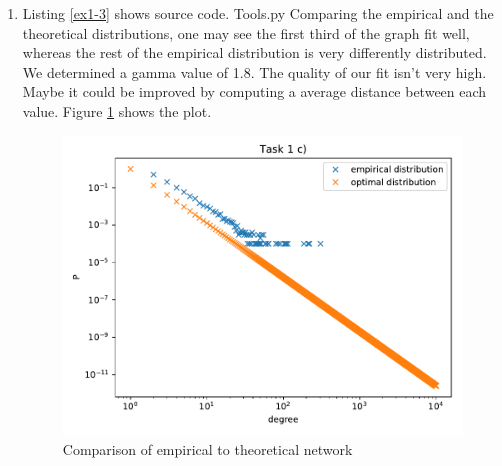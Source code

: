 \documentclass[10pt,a4paper]{article}
\begin{document}
\begin{enumerate}
\item Listing \ref{ex1-3} shows source code.
 {Tools.py}
Comparing the empirical and the theoretical distributions, one may see the first third of the graph fit well, whereas the rest of the empirical distribution is very differently distributed. We determined a gamma value of 1.8. The quality of our fit isn't very high. Maybe it could be improved by computing a average distance between each value. Figure \ref{fig-3} shows the plot.
\begin{figure}
\includegraphics[scale=1]{Figure_3.pdf}
\caption{Comparison of empirical to theoretical network}
\label{fig-3}
\end{figure}
\end{enumerate}
\end{document}
